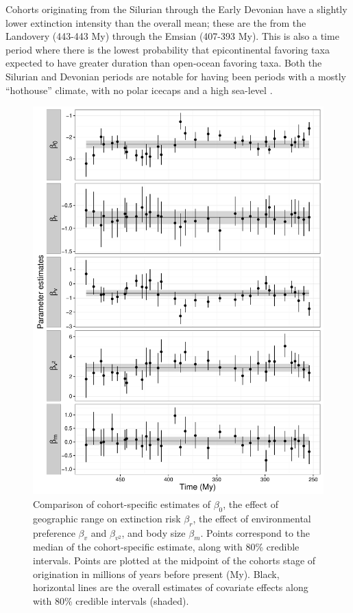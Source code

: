 \documentclass{article}
\begin{document}
Cohorts originating from the Silurian through the Early Devonian have a slightly lower extinction intensity than the overall mean; these are the from the Landovery (443-443 My) through the Emsian (407-393 My). This is also a time period where there is the lowest probability that epicontinental favoring taxa expected to have greater duration than open-ocean favoring taxa. Both the Silurian and Devonian periods are notable for having been periods with a mostly ``hothouse'' climate, with no polar icecaps and a high sea-level \citep{Edwards1985,Joachimski2009,Munnecke2010}.


\begin{figure}[ht]
  \centering
  \includegraphics[width = \textwidth,height = \textheight,keepaspectratio=true]{figure/cohort_series}
  \caption{Comparison of cohort-specific estimates of \(\beta_{0}\), the effect of geographic range on extinction risk \(\beta_{r}\), the effect of environmental preference \(\beta_{v}\) and \(\beta_{v^{2}}\), and body size \(\beta_{m}\). Points correspond to the median of the cohort-specific estimate, along with 80\% credible intervals. Points are plotted at the midpoint of the cohorts stage of origination in millions of years before present (My). Black, horizontal lines are the overall estimates of covariate effects along with 80\% credible intervals (shaded).}
  \label{fig:cohort_series}
\end{figure}
\end{document}
